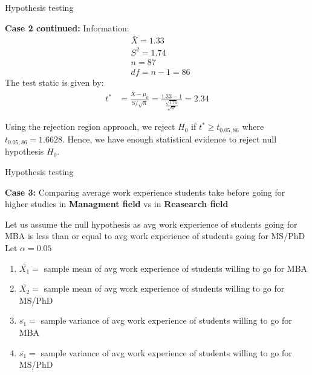 \documentclass{beamer}
\begin{document}
    \begin{frame}{Hypothesis testing}
        \begin{block}{\textbf{Case 2 continued:}}
            Information:
             \begin{align}
                 &\bar{X}= 1.33\\
                 &S^2 = 1.74\\
                 &n=87\\
                 &df = n-1 = 86
             \end{align}
             The test static is given by:
             \begin{align}
                 t^* &= \frac{\bar{X} - \mu_0}{ S/ \sqrt{n}}
                 = \frac{1.33 - 1}{\frac{\sqrt{1.74}}{\sqrt{87}}}
                 = 2.34
             \end{align}

             Using the rejection region approach, we reject $H_0$ if $ t^* \geq t_{0.05,86}$ where $t_{0.05,86} = 1.6628$. Hence, we have enough statistical evidence to reject null hypothesis $H_0$.
        \end{block}
    \end{frame}

\begin{frame}{Hypothesis testing}

    \begin{block}{\textbf{Case 3:} Comparing average work experience students
            take before going for higher studies in \textbf{Managment field} vs
            in \textbf{Reasearch field} }

        Let us assume the null hypothesis as avg work experience of students
        going for MBA is less than or equal to avg work experience of students going
        for MS/PhD
        \\Let $\alpha=0.05$ \\
        \begin{enumerate}
            \item $\bar{X_1} = $ sample mean of avg work experience of students
                  willing to go for MBA \\
            \item $\bar{X_2} = $ sample mean of avg work experience of students
                  willing to go for MS/PhD \\
            \item $\bar{s_1} = $ sample variance of avg work experience of
                  students willing to go for MBA \\
            \item $\bar{s_1} = $ sample variance of avg work experience of
                  students willing to go for MS/PhD \\
        \end{enumerate}
    \end{block}

\end{frame}
\end{document}
